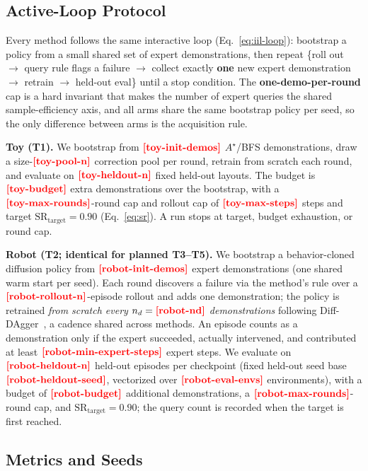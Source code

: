 \documentclass[letterpaper]{article} %
\newcommand{\PH}[1]{{\color{red}\textbf{[#1]}}}
\begin{document}
\subsection{Active-Loop Protocol}

Every method follows the same interactive loop (Eq.~\ref{eq:iil-loop}): bootstrap a
policy from a small shared set of expert demonstrations, then repeat \{roll out
$\to$ query rule flags a failure $\to$ collect exactly \textbf{one} new expert
demonstration $\to$ retrain $\to$ held-out eval\} until a stop condition. The
\textbf{one-demo-per-round} cap is a hard invariant that makes the number of expert
queries the shared sample-efficiency axis, and all arms share the same bootstrap
policy per seed, so the only difference between arms is the acquisition rule.

\textbf{Toy (T1).} We bootstrap from $\PH{toy-init-demos}$ $A^{\!\star}$/BFS
demonstrations, draw a size-$\PH{toy-pool-n}$ correction pool per round, retrain from
scratch each round, and evaluate on $\PH{toy-heldout-n}$ fixed held-out layouts. The
budget is $\PH{toy-budget}$ extra demonstrations over the bootstrap, with a
$\PH{toy-max-rounds}$-round cap and rollout cap of $\PH{toy-max-steps}$ steps and
target $\mathrm{SR}_\mathrm{target}=0.90$ (Eq.~\ref{eq:sr}). A run stops at target,
budget exhaustion, or round cap.

\textbf{Robot (T2; identical for planned T3--T5).} We bootstrap a behavior-cloned
diffusion policy from $\PH{robot-init-demos}$ expert demonstrations (one shared warm
start per seed). Each round discovers a failure via the method's rule over a
$\PH{robot-rollout-n}$-episode rollout and adds one demonstration; the policy is
retrained \emph{from scratch every} $n_d=\PH{robot-nd}$ \emph{demonstrations}
following Diff-DAgger~\cite{lee2025diffdagger}, a cadence shared across methods. An
episode counts as a demonstration only if the expert succeeded, actually intervened,
and contributed at least $\PH{robot-min-expert-steps}$ expert steps. We evaluate on
$\PH{robot-heldout-n}$ held-out episodes per checkpoint (fixed held-out seed base
$\PH{robot-heldout-seed}$, vectorized over $\PH{robot-eval-envs}$ environments), with
a budget of $\PH{robot-budget}$ additional demonstrations, a $\PH{robot-max-rounds}$-round
cap, and $\mathrm{SR}_\mathrm{target}=0.90$; the query count is recorded when the
target is first reached.

\subsection{Metrics and Seeds}
\end{document}
